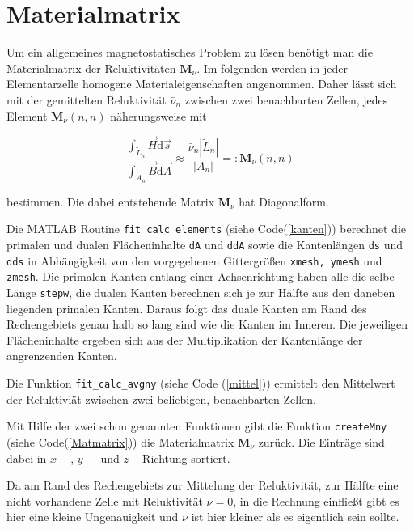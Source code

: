 \chapter{Materialmatrix}

Um ein allgemeines magnetostatisches Problem zu lösen benötigt man die Materialmatrix der Reluktivitäten $\textbf{M}_\nu$. Im folgenden werden in jeder Elementarzelle homogene Materialeigenschaften angenommen. Daher lässt sich mit der gemittelten Reluktivität $\bar{\nu}_n$ zwischen zwei benachbarten Zellen, jedes Element $\textbf{M}_\nu (n,n)$ näherungsweise mit 

\begin{equation*}
	\frac{\int_{\tilde{L}_n} \vec{H} \mathrm{d}\vec{s}}{\int_{A_n} \vec{B} \mathrm{d}\vec{A}} \approx \frac{\bar{\nu}_n |\tilde{L}_n|}{|A_n|} =: \textbf{M}_\nu(n,n)
\end{equation*}

bestimmen.
Die dabei entstehende Matrix $\textbf{M}_\nu$ hat Diagonalform.

Die MATLAB Routine \texttt{fit\_calc\_elements} (siehe Code(\ref{kanten})) berechnet die primalen und dualen Flächeninhalte \texttt{dA} und \texttt{ddA} sowie die Kantenlängen \texttt{ds} und \texttt{dds} in Abhängigkeit von den vorgegebenen Gittergrößen \texttt{xmesh, ymesh} und \texttt{zmesh}. Die primalen Kanten entlang einer Achsenrichtung haben alle die selbe Länge \texttt{stepw}, die dualen Kanten berechnen sich je zur Hälfte aus den daneben liegenden primalen Kanten. Daraus folgt das duale Kanten am Rand des Rechengebiets genau halb so lang sind wie die Kanten im Inneren. Die jeweiligen Flächeninhalte ergeben sich aus der Multiplikation der Kantenlänge der angrenzenden Kanten. 

Die Funktion \texttt{fit\_calc\_avgny} (siehe Code (\ref{mittel})) ermittelt den Mittelwert der Reluktiviät zwischen zwei beliebigen, benachbarten Zellen.

Mit Hilfe der zwei schon genannten Funktionen gibt die Funktion \texttt{createMny} (siehe Code(\ref{Matmatrix})) die Materialmatrix $\textbf{M}_\nu$ zurück. Die Einträge sind dabei in $x-$, $y-$ und $z-$Richtung sortiert.

Da am Rand des Rechengebiets zur Mittelung der Reluktivität, zur Hälfte eine nicht vorhandene Zelle mit Reluktivität $\nu = 0$, in die Rechnung einfließt gibt es hier eine kleine Ungenauigkeit und $\bar{\nu}$ ist hier kleiner als es eigentlich sein sollte. 